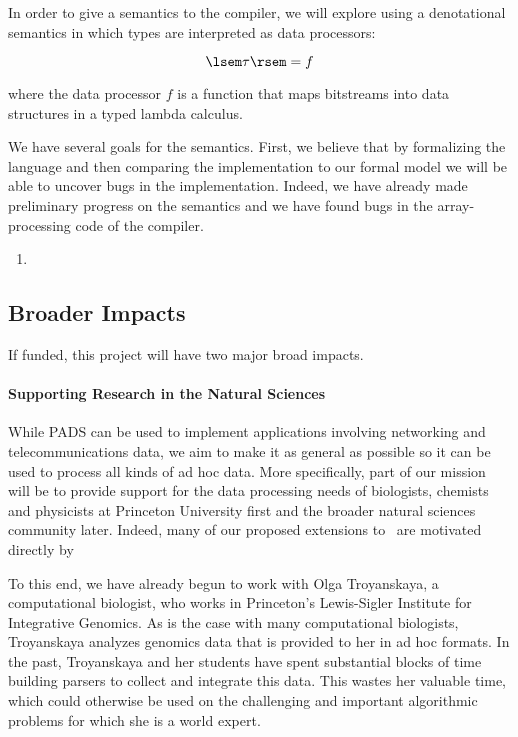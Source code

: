 \documentclass[11pt]{article}
\begin{document}
In order to give a semantics to the \pads{} compiler, we will explore using
a denotational semantics in which types are interpreted as data processors:

\[
\lsem \tau \rsem = f
\]

\noindent
where the data processor $f$ is a function that maps bitstreams into 
data structures in a typed lambda calculus.

We have several goals for the semantics.  First, we believe that
by formalizing the language and then comparing the implementation to our
formal model we will be able to uncover bugs in the implementation.
Indeed, we have already made preliminary progress on the semantics and we have
found bugs in the array-processing code of the compiler.  

\begin{enumerate}
\item 
\end{enumerate}


\subsection{Broader Impacts}
\label{ssec:impact}

If funded, this project will have two major broad impacts.

\paragraph*{Supporting Research in the Natural Sciences}
While PADS can be used to implement applications involving
networking and telecommunications data,  we aim to make it
as general as possible so it can be used to process all
kinds of ad hoc data.  More specifically, part of our mission will be
to provide support for the data processing needs of biologists,
chemists and physicists at Princeton University first and 
the broader natural sciences community later.  Indeed, many of our
proposed extensions to \pads{}\ are motivated directly by
 
To this end, we have already begun to work with Olga Troyanskaya, a
computational biologist, who works in Princeton's Lewis-Sigler Institute 
for Integrative Genomics.  
As is the case with many computational biologists,
Troyanskaya analyzes genomics data that is provided to her in ad hoc
formats.  In the past, Troyanskaya and her students have spent
substantial blocks of time building parsers to collect and integrate
this data.  This wastes her valuable time, which could otherwise be
used on the challenging and important algorithmic problems for which
she is a world expert.
\end{document}

